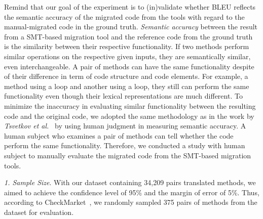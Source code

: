 Remind that our goal of the experiment is to (in)validate whether BLEU
reflects the semantic accuracy of the migrated code from the tools
with regard to the manual-migrated code in the ground truth. 
%
{\em Semantic accuracy} between the result from a SMT-based migration
tool and the reference code from the ground truth is the similarity
between their respective functionality. 
%
If two methods perform similar operations on the respective given
inputs, they are semantically similar, even interchangeable. A pair of
methods can have the same functionality despite of their difference in
term of code structure and code elements.
%
For example, a method using a  loop and another using a
 loop, they still can perform the same functionality even
though their lexical representations are much different. 
%
%
To minimize the inaccuracy in evaluating similar functionality between
the resulting code and the original code, we adopted the same
methodology as in the work by {\em Tsvetkov et
  al.}~\cite{tsvetkov-acl15} by using human judgment in measuring
semantic accuracy.
%
A human subject who examines a pair of methods can tell whether the
code perform the same functionality.
%
Therefore, we conducted a study with human subject to manually
evaluate the migrated code from the SMT-based migration tools.


\emph{1. Sample Size}. 
%
With our dataset containing 34,209 pairs translated methods, we aimed
to achieve the confidence level of 95\% and the margin of error of
5\%. Thus, according to CheckMarket~\cite{sample}, we randomly sampled
375 pairs of methods from the dataset for evaluation.

